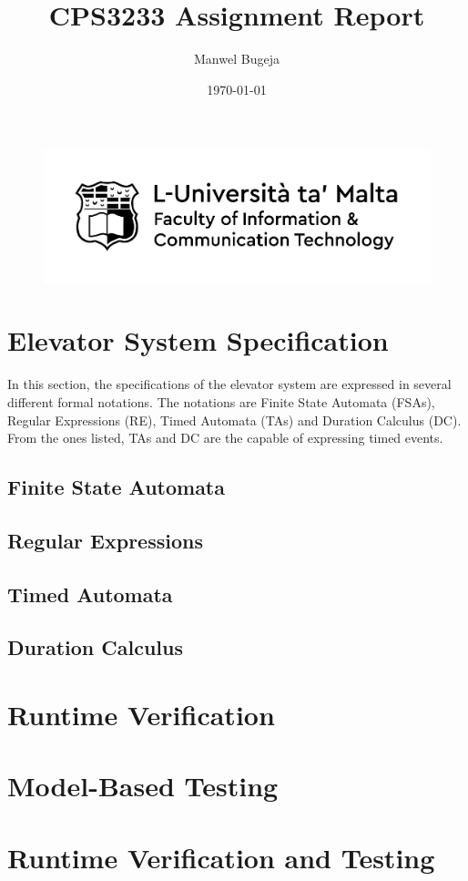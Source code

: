 \documentclass[a4paper, 12pt]{article}
\begin{document}
\begin{figure}
    \centering
    \includegraphics[width=1\textwidth]{Logo}
\end{figure}

\title{CPS3233 Assignment Report}
\author{Manwel Bugeja}
\date{\today}
\maketitle
  
\tableofcontents
\newpage

\section{Elevator System Specification}
In this section, the specifications of the elevator system are expressed in several different formal notations. The notations are Finite State Automata (FSAs), Regular Expressions (RE), Timed Automata (TAs) and Duration Calculus (DC). From the ones listed, TAs and DC are the capable of expressing timed events. \\

\subsection{Finite State Automata}
\subsection{Regular Expressions}
\subsection{Timed Automata}
\subsection{Duration Calculus}


\section{Runtime Verification}

\section{Model-Based Testing}

\section{Runtime Verification and Testing}


 
\end{document}
